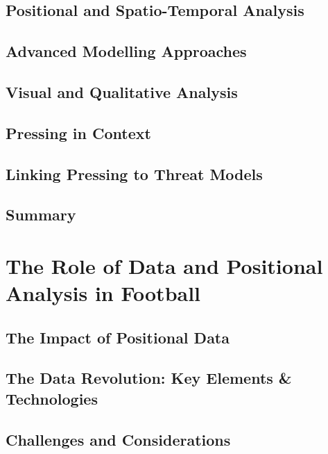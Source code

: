 \subsection{Positional and Spatio-Temporal Analysis}



\subsection{Advanced Modelling Approaches}



\subsection{Visual and Qualitative Analysis}




\subsection{Pressing in Context}




\subsection{Linking Pressing to Threat Models}




\subsection{Summary}


\section{The Role of Data and Positional Analysis in Football}

\subsection{The Impact of Positional Data}


\subsection{The Data Revolution: Key Elements & Technologies}


\subsection{Challenges and Considerations}


